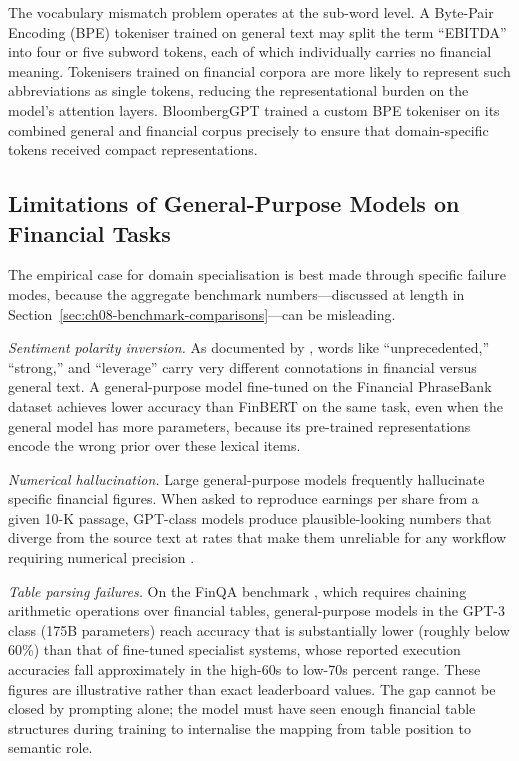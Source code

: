 \begin{remark}
The vocabulary mismatch problem operates at the sub-word level.  A Byte-Pair
Encoding (BPE) tokeniser trained on general text may split the term
``EBITDA'' into four or five subword tokens, each of which individually carries
no financial meaning.  Tokenisers trained on financial corpora are more likely
to represent such abbreviations as single tokens, reducing the representational
burden on the model's attention layers.  BloombergGPT \cite{wu2023bloomberggpt}
trained a custom BPE tokeniser on its combined general and financial corpus
precisely to ensure that domain-specific tokens received compact representations.
\end{remark}

\subsection{Limitations of General-Purpose Models on Financial Tasks}
\label{sec:ch08-limitations-general-purpose}

The empirical case for domain specialisation is best made through specific failure
modes, because the aggregate benchmark numbers---discussed at length in
Section~\ref{sec:ch08-benchmark-comparisons}---can be misleading.

\textit{Sentiment polarity inversion.}  As documented by \citet{loughran2011liability},
words like ``unprecedented,'' ``strong,'' and ``leverage'' carry very different
connotations in financial versus general text.  A general-purpose model fine-tuned
on the Financial PhraseBank dataset \cite{malo2014phrasebank} achieves lower
accuracy than FinBERT \cite{araci2019finbert} on the same task, even when the
general model has more parameters, because its pre-trained representations encode
the wrong prior over these lexical items.

\textit{Numerical hallucination.}  Large general-purpose models frequently
hallucinate specific financial figures.  When asked to reproduce earnings per
share from a given 10-K passage, GPT-class models produce plausible-looking
numbers that diverge from the source text at rates that make them unreliable for
any workflow requiring numerical precision \cite{kang2023hallucination}.

\textit{Table parsing failures.}  On the FinQA benchmark \cite{chen2021finqa},
which requires chaining arithmetic operations over financial tables, general-purpose
models in the GPT-3 class (175B parameters) reach accuracy that is substantially
lower (roughly below 60\%) than that of fine-tuned specialist systems, whose reported
execution accuracies fall approximately in the high-60s to low-70s percent range.
These figures are illustrative rather than exact leaderboard values. The gap cannot be closed by prompting
alone; the model must have seen enough financial table structures during training
to internalise the mapping from table position to semantic role.

